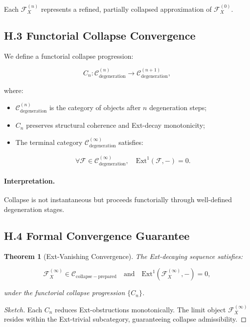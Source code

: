 \documentclass[11pt]{article}
\newtheorem{theorem}{Theorem}[section]
\begin{document}
Each \( \mathcal{F}_X^{(n)} \) represents a refined, partially collapsed approximation of \( \mathcal{F}_X^{(0)} \).

\subsection*{H.3 Functorial Collapse Convergence}

We define a functorial collapse progression:

\[
C_n : \mathcal{C}_{\mathrm{degeneration}}^{(n)} \longrightarrow \mathcal{C}_{\mathrm{degeneration}}^{(n+1)},
\]

where:

\begin{itemize}
    \item \( \mathcal{C}_{\mathrm{degeneration}}^{(n)} \) is the category of objects after \( n \) degeneration steps;
    \item \( C_n \) preserves structural coherence and Ext-decay monotonicity;
    \item The terminal category \( \mathcal{C}_{\mathrm{degeneration}}^{(\infty)} \) satisfies:

\[
\forall \mathcal{F} \in \mathcal{C}_{\mathrm{degeneration}}^{(\infty)}, \quad \mathrm{Ext}^1(\mathcal{F}, -) = 0.
\]
\end{itemize}

\paragraph{Interpretation.}
Collapse is not instantaneous but proceeds functorially through well-defined degeneration stages.

\subsection*{H.4 Formal Convergence Guarantee}

\begin{theorem}[Ext-Vanishing Convergence]
The Ext-decaying sequence satisfies:

\[
\mathcal{F}_X^{(\infty)} \in \mathcal{C}_{\mathrm{collapse-prepared}} \quad \text{and} \quad \mathrm{Ext}^1(\mathcal{F}_X^{(\infty)}, -) = 0,
\]

under the functorial collapse progression \( \{ C_n \} \).
\end{theorem}

\begin{proof}[Sketch]
Each \( C_n \) reduces Ext-obstructions monotonically. The limit object \( \mathcal{F}_X^{(\infty)} \) resides within the Ext-trivial subcategory, guaranteeing collapse admissibility.
\end{proof}
\end{document}
